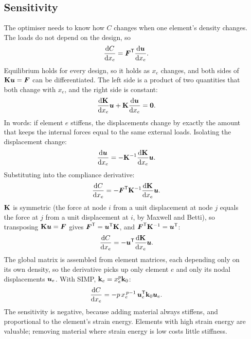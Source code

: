 \subsection{Sensitivity}

The optimiser needs to know how $C$ changes when one element's density changes. The loads do not depend on the design, so
\begin{equation}
\frac{\mathrm{d} C}{\mathrm{d} x_e} = \boldsymbol{F}^{\mathsf{T}}\frac{\mathrm{d}\boldsymbol{u}}{\mathrm{d} x_e}.
\end{equation}
Equilibrium holds for every design, so it holds as $x_e$ changes, and both sides of $\mathbf{K}\boldsymbol{u} = \boldsymbol{F}$ can be differentiated. The left side is a product of two quantities that both change with $x_e$, and the right side is constant:
\begin{equation}
\frac{\mathrm{d}\mathbf{K}}{\mathrm{d} x_e}\boldsymbol{u} + \mathbf{K}\frac{\mathrm{d}\boldsymbol{u}}{\mathrm{d} x_e} = \boldsymbol{0}.
\end{equation}
In words: if element $e$ stiffens, the displacements change by exactly the amount that keeps the internal forces equal to the same external loads. Isolating the displacement change:
\begin{equation}
\frac{\mathrm{d}\boldsymbol{u}}{\mathrm{d} x_e} = -\mathbf{K}^{-1}\frac{\mathrm{d}\mathbf{K}}{\mathrm{d} x_e}\boldsymbol{u}.
\end{equation}
Substituting into the compliance derivative:
\begin{equation}
\frac{\mathrm{d} C}{\mathrm{d} x_e} = -\boldsymbol{F}^{\mathsf{T}}\mathbf{K}^{-1}\frac{\mathrm{d}\mathbf{K}}{\mathrm{d} x_e}\boldsymbol{u}.
\end{equation}
$\mathbf{K}$ is symmetric (the force at node $i$ from a unit displacement at node $j$ equals the force at $j$ from a unit displacement at $i$, by Maxwell and Betti), so transposing $\mathbf{K}\boldsymbol{u} = \boldsymbol{F}$ gives $\boldsymbol{F}^{\mathsf{T}} = \boldsymbol{u}^{\mathsf{T}}\mathbf{K}$, and $\boldsymbol{F}^{\mathsf{T}}\mathbf{K}^{-1} = \boldsymbol{u}^{\mathsf{T}}$:
\begin{equation}
\frac{\mathrm{d} C}{\mathrm{d} x_e} = -\boldsymbol{u}^{\mathsf{T}}\frac{\mathrm{d}\mathbf{K}}{\mathrm{d} x_e}\boldsymbol{u}.
\end{equation}
The global matrix is assembled from element matrices, each depending only on its own density, so the derivative picks up only element $e$ and only its nodal displacements $\boldsymbol{u}_e$. With SIMP, $\mathbf{k}_e = x_e^p\mathbf{k}_0$:
\begin{equation}
\frac{\mathrm{d} C}{\mathrm{d} x_e} = -p\, x_e^{\,p-1}\, \boldsymbol{u}_e^{\mathsf{T}}\mathbf{k}_0\boldsymbol{u}_e.
\end{equation}
The sensitivity is negative, because adding material always stiffens, and proportional to the element's strain energy. Elements with high strain energy are valuable; removing material where strain energy is low costs little stiffness.

